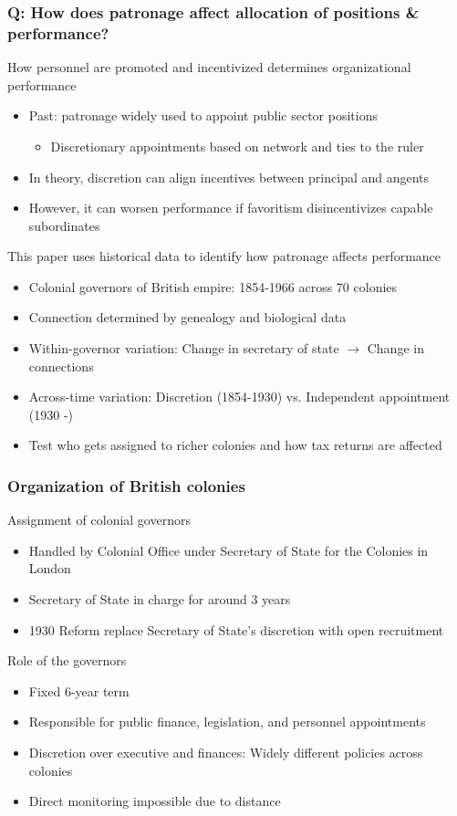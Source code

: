 \documentclass[aspectratio=169]{beamer}
\begin{document}
\begin{frame}
\frametitle{Q: How does patronage affect allocation of positions \& performance?} 
How personnel are promoted and incentivized determines organizational performance
\begin{itemize}\setlength\itemsep{3pt}
\item Past: patronage widely used to appoint public sector positions
\begin{itemize}
\item Discretionary appointments based on network and ties to the ruler
\end{itemize}
\item In theory, discretion can align incentives between principal and angents
\item However, it can worsen performance if favoritism disincentivizes capable subordinates
\end{itemize}\medskip
This paper uses historical data to identify how patronage affects performance
\begin{itemize}\setlength\itemsep{3pt}
\item Colonial governors of British empire: 1854-1966 across 70 colonies
\item Connection determined by genealogy and biological data
\item Within-governor variation: Change in secretary of state $\to$ Change in connections
\item Across-time variation: Discretion (1854-1930) vs. Independent appointment (1930 -)
\item Test who gets assigned to richer colonies and how tax returns are affected
\end{itemize}

\end{frame}

\begin{frame}
\frametitle{Organization of British colonies}
Assignment of colonial governors 
\begin{itemize}\setlength\itemsep{3pt}
\item Handled by Colonial Office under Secretary of State for the Colonies in London
\item Secretary of State in charge for around 3 years
\item 1930 Reform replace Secretary of State's discretion with open recruitment
\end{itemize}\medskip
Role of the governors
\begin{itemize}\setlength\itemsep{3pt}
\item Fixed 6-year term
\item Responsible for public finance, legislation, and personnel appointments
\item Discretion over executive and finances: Widely different policies across colonies
\item Direct monitoring impossible due to distance
\end{itemize}\medskip
\end{frame}
\end{document}
